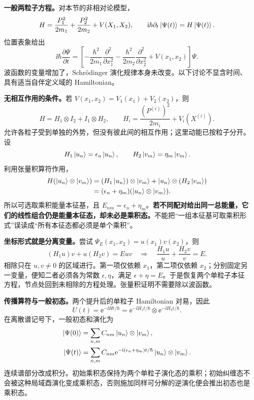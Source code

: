 \textbf{一般两粒子方程。}对本节的非相对论模型，
\begin{equation}
  H=\frac{P_1^2}{2m_1}+\frac{P_2^2}{2m_2}+V(X_1,X_2),
  \qquad \mathrm{i}\hbar\partial_t\left|\Psi(t)\right\rangle=H\left|\Psi(t)\right\rangle.
\end{equation}
位置表象给出
\begin{equation}
  \ii\hbar\frac{\partial\Psi}{\partial t}
  =\left[-\frac{\hbar^2}{2m_1}\frac{\partial^2}{\partial x_1^2}
         -\frac{\hbar^2}{2m_2}\frac{\partial^2}{\partial x_2^2}
         +V(x_1,x_2)\right]\Psi.
\end{equation}
波函数的变量增加了，Schr\"odinger 演化规律本身未改变。以下讨论不显含时间、具有适当自伴定义域的 Hamiltonian。

\textbf{无相互作用的条件。}若 $V(x_1,x_2)=V_1(x_1)+V_2(x_2)$，则
\begin{equation}
  \boxed{H=H_1\otimes I_2+I_1\otimes H_2},\qquad
  H_i=\frac{(P^{(i)})^2}{2m_i}+V_i(X^{(i)}).
  \label{eq:QM-C10-S01-separable-h}
\end{equation}
允许各粒子受到单独的外势，但没有彼此间的相互作用；这里动能已按粒子分开。设
\begin{equation}
  H_1\left|u_n\right\rangle=\epsilon_n\left|u_n\right\rangle,\qquad
  H_2\left|v_m\right\rangle=\eta_m\left|v_m\right\rangle.
\end{equation}
利用张量积算符作用，
\begin{align}
  H(\left|u_n\right\rangle\otimes\left|v_m\right\rangle)
  &=(H_1\left|u_n\right\rangle)\otimes\left|v_m\right\rangle
     +\left|u_n\right\rangle\otimes(H_2\left|v_m\right\rangle)\notag\\
  &=(\epsilon_n+\eta_m)(\left|u_n\right\rangle\otimes\left|v_m\right\rangle).
\end{align}
所以可选取乘积能量本征基，且 $E_{nm}=\epsilon_n+\eta_m$。\textbf{若不同配对给出同一总能量，它们的线性组合仍是能量本征态，却未必是乘积态。}不能把“一组本征基可取乘积形式”误读成“所有本征态都必须是单个乘积”。

\textbf{坐标形式就是分离变量。}尝试 $\Psi_E(x_1,x_2)=u(x_1)v(x_2)$，则
\begin{equation}
  (H_1u)v+u(H_2v)=Euv
  \quad\Longrightarrow\quad
  \frac{H_1u}{u}+\frac{H_2v}{v}=E.
\end{equation}
相除只在 $u,v\ne0$ 的区域进行。第一项仅依赖 $x_1$，第二项仅依赖 $x_2$；分别固定另一变量，便知二者必须各为常数 $\epsilon,\eta$，满足 $\epsilon+\eta=E$。于是恢复两个单粒子本征方程，节点处回到未相除的方程处理。张量积证明不需要除以波函数。

\textbf{传播算符与一般初态。}两个提升后的单粒子 Hamiltonian 对易，因此
\begin{equation}
  \boxed{U(t)=\ee^{-\ii Ht/\hbar}
   =\ee^{-\ii H_1t/\hbar}\otimes\ee^{-\ii H_2t/\hbar}}.
\end{equation}
在离散谱记号下，一般初态和演化为
\begin{align}
  \left|\Psi(0)\right\rangle&=\sum_{n,m}C_{nm}\left|u_n\right\rangle\otimes\left|v_m\right\rangle,\\
  \left|\Psi(t)\right\rangle&=\sum_{n,m}C_{nm}
       \mathrm{e}^{-\mathrm{i}(\epsilon_n+\eta_m)t/\hbar}
       \left|u_n\right\rangle\otimes\left|v_m\right\rangle.
\end{align}
连续谱部分改成积分。初始乘积态保持为两个单粒子演化态的乘积；初始纠缠态不会被这种局域酉演化变成乘积态，否则施加同样可分解的逆演化便会推出初态也是乘积态。

